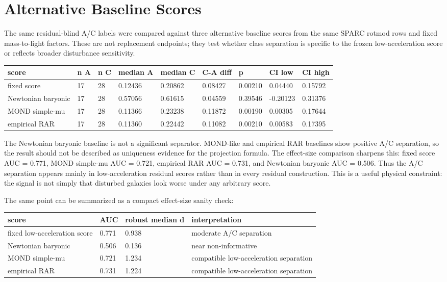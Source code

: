 \documentclass[11pt]{article}
\begin{document}
\section{Alternative Baseline Scores}
The same residual-blind A/C labels were compared against three alternative baseline scores from the same SPARC rotmod rows and fixed mass-to-light factors. These are not replacement endpoints; they test whether class separation is specific to the frozen low-acceleration score or reflects broader disturbance sensitivity.

\begin{table}[htbp]
\centering
\footnotesize
\setlength{\tabcolsep}{3pt}
\begin{tabularx}{\linewidth}{Y Y Y Y Y Y Y Y Y}
\toprule
score & n A & n C & median A & median C & C-A diff & p & CI low & CI high \\
\midrule
fixed score & 17 & 28 & 0.12436 & 0.20862 & 0.08427 & 0.00210 & 0.04440 & 0.15792 \\
Newtonian baryonic & 17 & 28 & 0.57056 & 0.61615 & 0.04559 & 0.39546 & -0.20123 & 0.31376 \\
MOND simple-mu & 17 & 28 & 0.11366 & 0.23238 & 0.11872 & 0.00190 & 0.00305 & 0.17644 \\
empirical RAR & 17 & 28 & 0.11360 & 0.22442 & 0.11082 & 0.00210 & 0.00583 & 0.17395 \\
\bottomrule
\end{tabularx}
\end{table}
The Newtonian baryonic baseline is not a significant separator. MOND-like and empirical RAR baselines show positive A/C separation, so the result should not be described as uniqueness evidence for the projection formula. The effect-size comparison sharpens this: fixed score AUC = 0.771, MOND simple-mu AUC = 0.721, empirical RAR AUC = 0.731, and Newtonian baryonic AUC = 0.506. Thus the A/C separation appears mainly in low-acceleration residual scores rather than in every residual construction. This is a useful physical constraint: the signal is not simply that disturbed galaxies look worse under any arbitrary score.

The same point can be summarized as a compact effect-size sanity check:

\begin{table}[htbp]
\centering
\footnotesize
\setlength{\tabcolsep}{3pt}
\begin{tabularx}{\linewidth}{Y Y Y Y}
\toprule
score & AUC & robust median d & interpretation \\
\midrule
fixed low-acceleration score & 0.771 & 0.938 & moderate A/C separation \\
Newtonian baryonic & 0.506 & 0.136 & near non-informative \\
MOND simple-mu & 0.721 & 1.234 & compatible low-acceleration separation \\
empirical RAR & 0.731 & 1.224 & compatible low-acceleration separation \\
\bottomrule
\end{tabularx}
\end{table}
\end{document}
